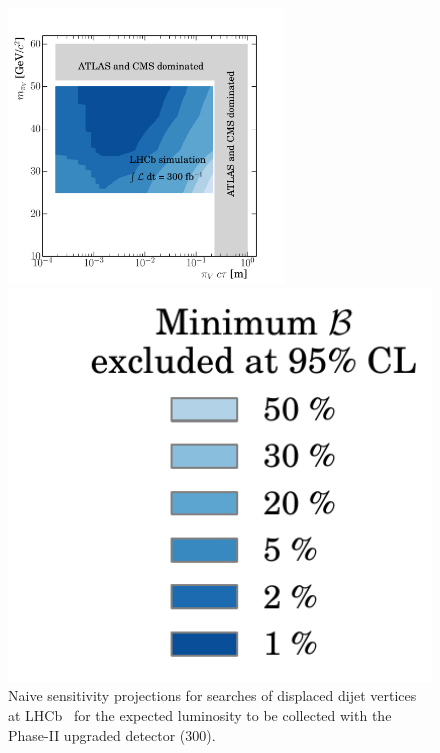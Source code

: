 \begin{figure}[t]
  \includegraphics[width=0.65\textwidth]{figures/LLP_compare_PIV_4_HL.pdf}
  \begin{minipage}[t]{0.26\textwidth}
  \vspace{-6.cm}
  \hspace{-0.7cm}
  \includegraphics[width=1.2\textwidth]{figures/LLP_compare_legend.pdf}
  \end{minipage}
  \caption{Naive sensitivity projections for searches of displaced dijet vertices at LHCb~\cite{Aaij:2017mic} for the expected luminosity to be collected with the Phase-II upgraded detector (300\invfb). %
}
  \label{fig:dvsearches_hllhc}
\end{figure}

